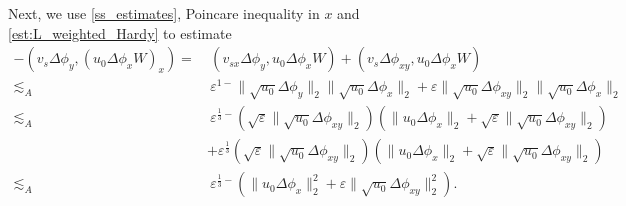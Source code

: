 \documentclass[reqno, 11pt]{amsart}
\theoremstyle{plain}
\theoremstyle{definition}
\theoremstyle{remark}
\numberwithin{equation}{section}
\begin{document}
Next, we use \eqref{ss_estimates}, Poincare inequality in $x$ and \eqref{est:L_weighted_Hardy} to estimate
\begin{equation}\label{N_Ray_3}
\begin{aligned}
-(v_s \Delta \phi_y, (u_0 \Delta\phi_x W)_x) =&~ (v_{sx}\Delta \phi_y, u_0 \Delta\phi_x W) + (v_{s}\Delta \phi_{xy}, u_0 \Delta\phi_x W)\\
\lesssim_A&~ \varepsilon^{1-}\| \sqrt{u_0} \Delta \phi_y\|_2 \| \sqrt{u_0} \Delta \phi_x\|_2 + \varepsilon \| \sqrt{u_0} \Delta \phi_{xy}\|_2 \| \sqrt{u_0} \Delta \phi_x\|_2\\
\lesssim_A&~ \varepsilon^{\frac{1}{3}-} (\sqrt{\varepsilon}  \| \sqrt{u_0} \Delta \phi_{xy}\|_2) (\|u_0 \Delta \phi_x\|_2  +  \sqrt{\varepsilon} \| \sqrt{u_0} \Delta \phi_{xy} \|_2)\\
&+ \varepsilon^{\frac{1}{3}} (\sqrt{\varepsilon}  \| \sqrt{u_0} \Delta \phi_{xy}\|_2) (\|u_0 \Delta \phi_x\|_2  +  \sqrt{\varepsilon} \| \sqrt{u_0} \Delta \phi_{xy} \|_2)\\
\lesssim_A&~ \varepsilon^{\frac{1}{3}-}(\|u_0 \Delta \phi_x\|_2^2  +  \varepsilon \| \sqrt{u_0} \Delta \phi_{xy} \|_2^2).
\end{aligned}
\end{equation}
\end{document}
